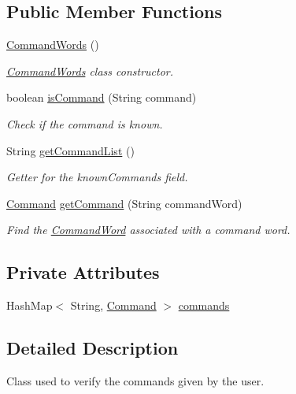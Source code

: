 \subsection*{Public Member Functions}
\begin{DoxyCompactItemize}
\item 
\hyperlink{classpkg__parsing_1_1CommandWords_ac01e3b4727e741eb8add2eef27c8f7b7}{Command\-Words} ()
\begin{DoxyCompactList}\small\item\em \hyperlink{classpkg__parsing_1_1CommandWords}{Command\-Words} class constructor. \end{DoxyCompactList}\item 
boolean \hyperlink{classpkg__parsing_1_1CommandWords_ab02b508bb42cbda758afe6cee5794216}{is\-Command} (String command)
\begin{DoxyCompactList}\small\item\em Check if the command is known. \end{DoxyCompactList}\item 
String \hyperlink{classpkg__parsing_1_1CommandWords_a55f01013b1d051547ee3fa6605ea4c14}{get\-Command\-List} ()
\begin{DoxyCompactList}\small\item\em Getter for the known\-Commands field. \end{DoxyCompactList}\item 
\hyperlink{classpkg__commands_1_1Command}{Command} \hyperlink{classpkg__parsing_1_1CommandWords_a244829164976aa9444b3b1e84462ac5c}{get\-Command} (String command\-Word)
\begin{DoxyCompactList}\small\item\em Find the \hyperlink{enumpkg__parsing_1_1CommandWord}{Command\-Word} associated with a command word. \end{DoxyCompactList}\end{DoxyCompactItemize}
\subsection*{Private Attributes}
\begin{DoxyCompactItemize}
\item 
Hash\-Map$<$ String, \hyperlink{classpkg__commands_1_1Command}{Command} $>$ \hyperlink{classpkg__parsing_1_1CommandWords_a82467831861a15539131a50c22e826fc}{commands}
\end{DoxyCompactItemize}


\subsection{Detailed Description}
Class used to verify the commands given by the user. 

